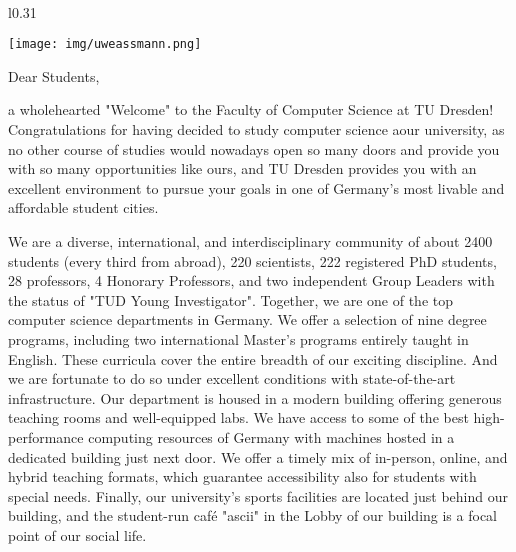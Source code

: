 \thispagestyle{empty}
\
\pagebreak


\begin{wrapfigure}{l}{0.31\textwidth}
  \vspace{-12pt}
  \begin{centering}
    \texttt{[image: img/uweassmann.png]}
  \end{centering}
  \vspace{-15pt}
\end{wrapfigure}

{\fontsize{10pt}{11}\selectfont
Dear Students,

a wholehearted "Welcome" to the Faculty of Computer Science at TU Dresden! Congratulations for having decided to study computer science aour university, as no other course of studies would nowadays open so many doors and provide you with so many opportunities like ours, and TU Dresden provides you with an excellent environment to pursue your goals in one of Germany’s most livable and affordable student cities.

We are a diverse, international, and interdisciplinary community of about 2400 students (every third from abroad), 220 scientists, 222 registered PhD students, 28 professors, 4 Honorary Professors, and two independent Group Leaders with the status of "TUD Young Investigator". Together, we are one of the top computer science departments in Germany. We offer a selection of nine degree programs, including two international Master’s programs entirely taught in English. These curricula cover the entire breadth of our exciting discipline. And we are fortunate to do so under excellent conditions with state-of-the-art infrastructure. Our department is housed in a modern building offering generous teaching rooms and well-equipped labs. We have access to some of the best high-performance computing resources of Germany with machines hosted in a dedicated building just next door. We offer a timely mix of in-person, online, and hybrid teaching formats, which guarantee accessibility also for students with special needs. Finally, our university's sports facilities are located just behind our building, and the student-run café "ascii" in the Lobby of our building is a focal point of our social life.

}

